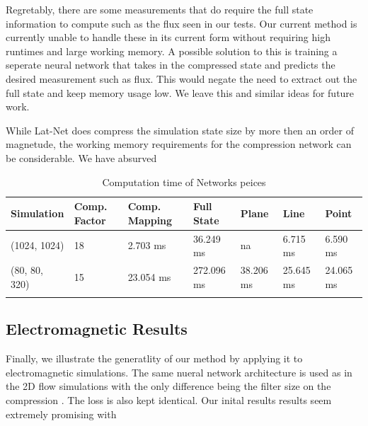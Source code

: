 \documentclass{article}
\begin{document}
Regretably, there are some measurements that do require the full state information to compute such as the flux seen in our tests. Our current method is currently unable to handle these in its current form without requiring high runtimes and large working memory. A possible solution to this is training a seperate neural network that takes in the compressed state and predicts the desired measurement such as flux. This would negate the need to extract out the full state and keep memory usage low. We leave this and similar ideas for future work.

While Lat-Net does compress the simulation state size by more then an order of magnetude, the working memory requirements for the compression network can be considerable. We have absurved


\begin{table}[]
\small
\caption{Computation time of Networks peices} \label{compute_times}
\centering
\begin{tabular}{|l|llllll|}
\hline
Simulation    & Comp. Factor       & Comp. Mapping       & Full State  & Plane      & Line       & Point \\ \hline
(1024, 1024)  & 18                 & 2.703 ms            & 36.249 ms   & na         & 6.715 ms   & 6.590 ms \\
(80, 80, 320) & 15                 & 23.054 ms           & 272.096 ms  & 38.206 ms  & 25.645 ms  & 24.065 ms \\  
\\ \hline
\end{tabular}
\label{computation_table}
\end{table}

\subsection{Electromagnetic Results}

Finally, we illustrate the generatlity of our method by applying it to electromagnetic simulations. The same nueral network architecture is used as in the 2D flow simulations with the only difference being the filter size on the compression . The loss is also kept identical. Our inital results results seem extremely promising with 
\end{document}
